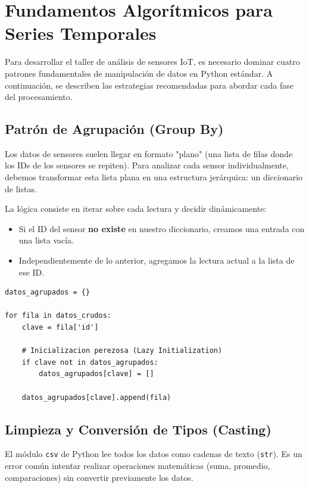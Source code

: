\documentclass[11pt, a4paper]{article}
\begin{document}
\newpage
\section{Fundamentos Algorítmicos para Series Temporales}

Para desarrollar el taller de análisis de sensores IoT, es necesario dominar cuatro patrones fundamentales de manipulación de datos en Python estándar. A continuación, se describen las estrategias recomendadas para abordar cada fase del procesamiento.

\subsection{Patrón de Agrupación (Group By)}
Los datos de sensores suelen llegar en formato "plano" (una lista de filas donde los IDs de los sensores se repiten). Para analizar cada sensor individualmente, debemos transformar esta lista plana en una estructura jerárquica: un diccionario de listas.

La lógica consiste en iterar sobre cada lectura y decidir dinámicamente:
\begin{itemize}
    \item Si el ID del sensor \textbf{no existe} en nuestro diccionario, creamos una entrada con una lista vacía.
    \item Independientemente de lo anterior, agregamos la lectura actual a la lista de ese ID.
\end{itemize}

\begin{lstlisting}[caption={Pseudocódigo para agrupar datos}]
datos_agrupados = {}

for fila in datos_crudos:
    clave = fila['id']

    # Inicializacion perezosa (Lazy Initialization)
    if clave not in datos_agrupados:
        datos_agrupados[clave] = []

    datos_agrupados[clave].append(fila)
\end{lstlisting}

\subsection{Limpieza y Conversión de Tipos (Casting)}
El módulo \texttt{csv} de Python lee todos los datos como cadenas de texto (\texttt{str}). Es un error común intentar realizar operaciones matemáticas (suma, promedio, comparaciones) sin convertir previamente los datos.
\end{document}
